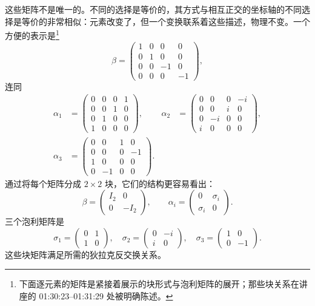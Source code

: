 这些矩阵不是唯一的。不同的选择是等价的，其方式与相互正交的坐标轴的不同选择是等价的非常相似：元素改变了，但一个变换联系着这些描述，物理不变。一个方便的表示是\footnote{下面逐元素的矩阵是紧接着展示的块形式与泡利矩阵的展开；那些块关系在讲座的 01:30:23--01:31:29 处被明确陈述。}
\begin{equation}
\beta=
\begin{pmatrix}
1&0&0&0\\
0&1&0&0\\
0&0&-1&0\\
0&0&0&-1
\end{pmatrix},
\end{equation}
连同
\begin{align}
\alpha_1&=
\begin{pmatrix}
0&0&0&1\\
0&0&1&0\\
0&1&0&0\\
1&0&0&0
\end{pmatrix},
&
\alpha_2&=
\begin{pmatrix}
0&0&0&-i\\
0&0&i&0\\
0&-i&0&0\\
i&0&0&0
\end{pmatrix},
\\[1ex]
\alpha_3&=
\begin{pmatrix}
0&0&1&0\\
0&0&0&-1\\
1&0&0&0\\
0&-1&0&0
\end{pmatrix}.
\end{align}
通过将每个矩阵分成 \(2\times2\) 块，它们的结构更容易看出：
\begin{equation}
\beta=
\begin{pmatrix}
I_2&0\\
0&-I_2
\end{pmatrix},
\qquad
\alpha_i=
\begin{pmatrix}
0&\sigma_i\\
\sigma_i&0
\end{pmatrix}.
\end{equation}
三个泡利矩阵是
\begin{equation}
\sigma_1=
\begin{pmatrix}
0&1\\
1&0
\end{pmatrix},
\quad
\sigma_2=
\begin{pmatrix}
0&-i\\
i&0
\end{pmatrix},
\quad
\sigma_3=
\begin{pmatrix}
1&0\\
0&-1
\end{pmatrix}.
\end{equation}
这些块矩阵满足所需的狄拉克反交换关系。

